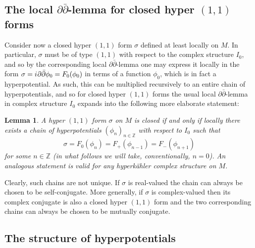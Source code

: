 \documentclass[11pt]{amsart}
\newtheorem{lemma}[theorem]{Lemma}
\theoremstyle{remark}
\theoremstyle{remark}
\theoremstyle{definition}
\theoremstyle{definition}
\theoremstyle{definition}
\newcommand{\0}{{\scriptstyle 0'}} %
\newcommand{\1}{{\scriptstyle 1'}}
\newcommand{\pt}{\hspace{1pt}} %
\newcommand{\hp}{\hspace{0.5pt}} %
\begin{document}
\subsection{The local \mbox{$\partial\bar{\partial}$\pt-\hp lemma} for closed hyper $(1,1)$ forms} \hfill \medskip



Consider now a closed hyper $(1,1)$ form $\sigma$ defined at least locally on $M$. In particular, $\sigma$ must be of type $(1,1)$ with respect to the complex structure $I_0$, and so by the corresponding local \mbox{$\partial\bar{\partial}$\pt-\hp lemma} one may express it locally in the form $\sigma = i \hp \partial\bar{\partial} \phi_0 = F_0(\phi_0)$ in terms of a function $\phi_0$, which is in fact a hyperpotential. As such, this can be multiplied recursively to an entire chain of hyperpotentials, and so for closed hyper $(1,1)$ forms the usual local \mbox{$\partial\bar{\partial}$\pt-\hp lemma} in complex structure $I_0$ expands into the following more elaborate statement: 

\begin{lemma} \label{exp_ddbar_lem}
A hyper $(1,1)$ form $\sigma$ on $M$ is closed if and only if locally there exists a chain of hyperpotentials $(\phi_n)_{n \in \mathbb{Z}}$ with respect to $I_0$ such that
\begin{equation}
\sigma = F_0(\phi_n) = F_+(\phi_{n-1}) = F_-(\phi_{n+1})  
\end{equation} 
for some $n \in \mathbb{Z}$ (in what follows we will take, conventionally, \mbox{$n=0$}). An analogous statement is valid for any hyperk\"ahler complex structure on $M$.
\end{lemma}

\noindent Clearly, such chains are not unique. If $\sigma$ is real-valued the chain can always be chosen to be self-conjugate. More generally, if $\sigma$ is complex-valued then its complex conjugate is also a closed hyper $(1,1)$ form and the two corresponding chains can always be chosen to be mutually conjugate. 


\subsection{The structure of hyperpotentials} \label{ssec:hyper_str} \hfill \medskip
\end{document}
